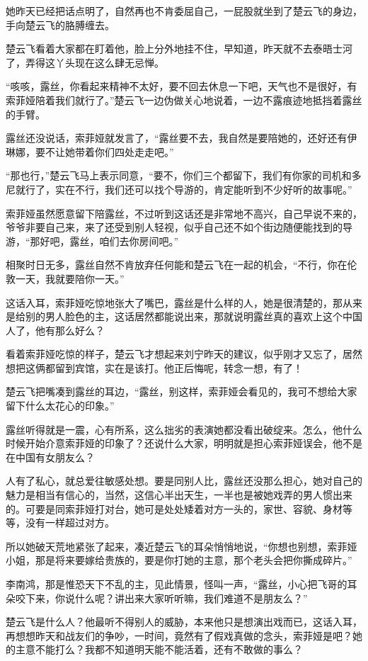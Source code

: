 她昨天已经把话点明了，自然再也不肯委屈自己，一屁股就坐到了楚云飞的身边，手向楚云飞的胳膊缠去。

楚云飞看着大家都在盯着他，脸上分外地挂不住，早知道，昨天就不去泰晤士河了，弄得这丫头现在这么肆无忌惮。

“咳咳，露丝，你看起来精神不太好，要不回去休息一下吧，天气也不是很好，有索菲娅陪着我们就行了。”楚云飞一边伪做关心地说着，一边不露痕迹地抵挡着露丝的手臂。

露丝还没说话，索菲娅就发言了，“露丝要不去，我自然是要陪她的，还好还有伊琳娜，要不让她带着你们四处走走吧。”

“那也行，”楚云飞马上表示同意，“要不，你们三个都留下，我们有你家的司机和多尼就行了，实在不行，我们还可以找个导游的，肯定能听到不少好听的故事呢。”

索菲娅虽然愿意留下陪露丝，不过听到这话还是非常地不高兴，自己早说不来的，爷爷非要自己来，来了还受到别人轻视，似乎自己还不如个街边随便能找到的导游，“那好吧，露丝，咱们去你房间吧。”

相聚时日无多，露丝自然不肯放弃任何能和楚云飞在一起的机会，“不行，你在伦敦一天，我就要陪你一天。”

这话入耳，索菲娅吃惊地张大了嘴巴，露丝是什么样的人，她是很清楚的，那从来是给别的男人脸色的主，这话居然都能说出来，那就说明露丝真的喜欢上这个中国人了，他有那么好么？

看着索菲娅吃惊的样子，楚云飞才想起来刘宁昨天的建议，似乎刚才又忘了，居然想把这俩都留到宾馆，实在是该打。他正后悔呢，转念一想，有了！

楚云飞把嘴凑到露丝的耳边，“露丝，别这样，索菲娅会看见的，我可不想给大家留下什么太花心的印象。”

露丝听得就是一震，心有所系，这么拙劣的表演她都没看出破绽来。怎么，他什么时候开始介意索菲娅的印象了？还说什么大家，明明就是担心索菲娅误会，他不是在中国有女朋友么？

人有了私心，就总爱往敏感处想。要是同别人比，露丝还没那么担心，她对自己的魅力是相当有信心的，当然，这信心半出天生，一半也是被她戏弄的男人惯出来的。可要是同索菲娅打对台，她可是处处矮着对方一头的，家世、容貌、身材等等，没有一样超过对方。

所以她破天荒地紧张了起来，凑近楚云飞的耳朵悄悄地说，“你想也别想，索菲娅小姐，那是将来要嫁给贵族的，要是你打她的主意，那个老头会把你撕成碎片。”

李南鸿，那是惟恐天下不乱的主，见此情景，怪叫一声，“露丝，小心把飞哥的耳朵咬下来，你说什么呢？讲出来大家听听嘛，我们难道不是朋友么？”

楚云飞是什么人？他最听不得别人的威胁，本来他只是想演出戏而已，这话入耳，再想想昨天和战友们的争吵，一时间，竟然有了假戏真做的念头，索菲娅是吧？她的主意不能打么？我都不知道明天能不能活着，还有不敢做的事么？

